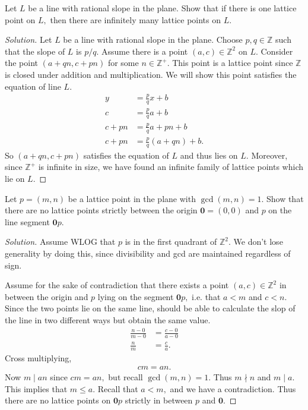 \documentclass[12pt]{article}
\newcommand{\Z}{\mathbb{Z}}
\newenvironment{exercise}[2][Exercise]{\begin{trivlist}
        \item[\hskip \labelsep {\bfseries #1}\hskip \labelsep {\bfseries #2.}]}{\end{trivlist}}
\newenvironment{solution}
        {\begin{proof}[Solution]}
                    {\end{proof}}
\begin{document}
\begin{exercise}{24}
    Let \( L \) be a line with rational slope in the plane. Show that if there is one lattice point on \( L, \) then there are infinitely many lattice points on \( L. \)
    \begin{solution}
        Let \( L \) be a line with rational slope in the plane. Choose \( p,q \in \Z \) such that the slope of \( L \) is \( p/q. \) Assume there is a point \( (a,c) \in \Z^{2} \) on \( L. \) Consider the point \( ( a + qn, c + pn ) \) for some \( n \in \Z^{+} . \) This point is a lattice point since \( \Z \) is closed under addition and multiplication. We will show this point satisfies the equation of line \( L. \)
        \begin{align*}
            y &= \frac{p}{q} x + b\\[.5ex]
            c &= \frac{p}{q}a + b\\[.5ex]
            c + pn &= \frac{p}{q} a + pn + b\\[.5ex]
            c + pn &= \frac{p}{q} (a + qn) + b.
        \end{align*}
        So \( ( a+qn, c+pn ) \) satisfies the equation of \( L \) and thus lies on \( L. \) Moreover, since \( \Z^{+} \) is infinite in size, we have found an infinite family of lattice points which lie on \( L. \)
    \end{solution}
\end{exercise}

\begin{exercise}{25}
    Let \( p = ( m,n ) \) be a lattice point in the plane with \( \gcd(m,n) = 1. \) Show that there are no lattice points strictly between the origin \( \mathbf{0} = ( 0,0 ) \) and \( p \) on the line segment \( \mathbf{0}p. \)
    \begin{solution}
        Assume WLOG that \( p \) is in the first quadrant of \( \Z^{2} . \) We don't lose generality by doing this, since divisibility and gcd are maintained regardless of sign.

        Assume for the sake of contradiction that there exists a point \( ( a,c ) \in \Z^{2} \) in between the origin and \( p \) lying on the segment \( \mathbf{0}p, \) i.e. that \( a < m \) and \( c < n. \) Since the two points lie on the same line, should be able to calculate the slop of the line in two different ways but obtain the same value.
        \begin{align*}
            \frac{n - 0}{m - 0} &= \frac{c - 0}{a - 0}\\
            \frac{n}{m} &= \frac{c}{a} .
        \end{align*}
        Cross multiplying,
        \begin{align*}
            cm = an.
        \end{align*}
        Now \( m \mid an \) since \( cm = an, \) but recall \( \gcd(m,n) = 1. \) Thus \( m \nmid n \) and \( m \mid a. \) This implies that \( m \leq a. \) Recall that \( a < m, \) and we have a contradiction. Thus there are no lattice points on \( \mathbf{0}p \) strictly in between \( p \) and \( \mathbf{0} \).
    \end{solution}
\end{exercise}
\end{document}
